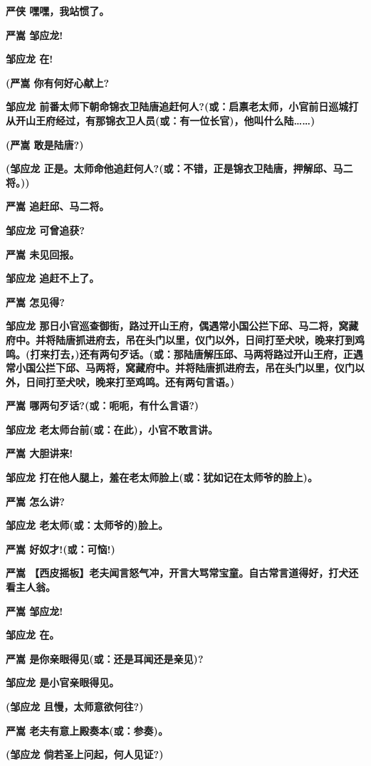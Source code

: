 \textbf{严侠 嘿嘿，我站惯了。}

\textbf{严嵩 邹应龙!}

\textbf{邹应龙 在!}

\textbf{(严嵩 你有何好心献上?}

\textbf{邹应龙
前番太师下朝命锦衣卫陆唐追赶何人?(或：启禀老太师，小官前日巡城打从开山王府经过，有那锦衣卫人员(或：有一位长官)，他叫什么陆\ldots{}\ldots{})}

\textbf{(严嵩 敢是陆唐?)}

\textbf{(邹应龙
正是。太师命他追赶何人?(或：不错，正是锦衣卫陆唐，押解邱、马二将。))}

\textbf{严嵩 追赶邱、马二将。}

\textbf{邹应龙 可曾追获?}

\textbf{严嵩 未见回报。}

\textbf{邹应龙 追赶不上了。}

\textbf{严嵩 怎见得?}

\textbf{邹应龙
那日小官巡查御街，路过开山王府，偶遇常小国公拦下邱、马二将，窝藏府中。并将陆唐抓进府去，吊在头门以里，仪门以外，日间打至犬吠，晚来打到鸡鸣。(打来打去，)还有两句歹话。(或：那陆唐解压邱、马两将路过开山王府，正遇常小国公拦下邱、马两将，窝藏府中。并将陆唐抓进府去，吊在头门以里，仪门以外，日间打至犬吠，晚来打至鸡鸣。还有两句言语。)}

\textbf{严嵩 哪两句歹话?(或：呃呃，有什么言语?)}

\textbf{邹应龙 老太师台前(或：在此)，小官不敢言讲。}

\textbf{严嵩 大胆讲来!}

\textbf{邹应龙 打在他人腿上，羞在老太师脸上(或：犹如记在太师爷的脸上)。}

\textbf{严嵩 怎么讲?}

\textbf{邹应龙 老太师(或：太师爷的)脸上。}

\textbf{严嵩 好奴才!(或：可恼!)}

\textbf{严嵩
【西皮摇板】老夫闻言怒气冲，开言大骂常宝童。自古常言道得好，打犬还看主人翁。}

\textbf{严嵩 邹应龙!}

\textbf{邹应龙 在。}

\textbf{严嵩 是你亲眼得见(或：还是耳闻还是亲见)?}

\textbf{邹应龙 是小官亲眼得见。}

\textbf{(邹应龙 且慢，太师意欲何往?)}

\textbf{严嵩 老夫有意上殿奏本(或：参奏)。}

\textbf{(邹应龙 倘若圣上问起，何人见证?)}

